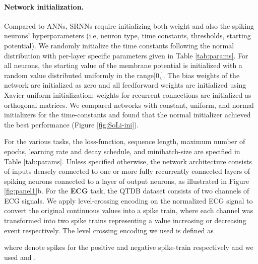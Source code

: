 \documentclass[fleqn,10pt]{wlscirep}
\begin{document}
\paragraph{Network initialization.}  Compared to ANNs, SRNNs require initializing both weight and also the spiking neurons' hyperparameters (i.e, neuron type, time constants, thresholds, starting potential). We randomly initialize the time constants following the normal distribution  with per-layer specific parameters given in Table \ref{tab:params}. For all neurons, the starting value of the membrane potential is initialized with a random value distributed uniformly in the range[0,]. The bias weights of the network are initialized as zero and all feedforward weights are initialized using Xavier-uniform initialization; weights for recurrent connections are initialized as orthogonal matrices. We compared networks with constant, uniform, and normal initializers for the time-constants and found that the normal initializer achieved the best performance (Figure \ref{fig:SoLi-ini}). 






For the various tasks, the loss-function, sequence length, maximum number of epochs, learning rate and decay schedule, and minibatch-size are specified in Table \ref{tab:params}. Unless specified otherwise, the network architecture consists of inputs densely connected to one or more fully recurrently connected layers of spiking neurons connected to a layer of output neurons, as illustrated in Figure \ref{fig:panel1}b. For the {\bf ECG} task, the QTDB dataset \cite{laguna1997database} consists of two channels of ECG signals. We apply level-crossing encoding \cite{lichtsteiner2008128} on the normalized ECG signal to convert the original continuous values into a spike train, where each channel was transformed into two spike trains representing a value increasing or decreasing event respectively. The level crossing encoding we used is defined as 

where  denote spikes for the positive and negative spike-train respectively and we used  and . 
\end{document}
